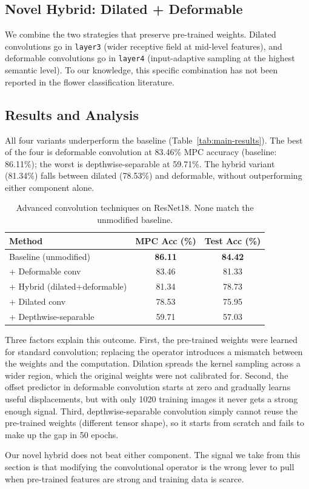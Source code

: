 \subsection{Novel Hybrid: Dilated + Deformable}
We combine the two strategies that preserve pre-trained weights. Dilated convolutions go in \texttt{layer3} (wider receptive field at mid-level features), and deformable convolutions go in \texttt{layer4} (input-adaptive sampling at the highest semantic level). To our knowledge, this specific combination has not been reported in the flower classification literature.

\subsection{Results and Analysis}
All four variants underperform the baseline (Table~\ref{tab:main-results}). The best of the four is deformable convolution at 83.46\% MPC accuracy (baseline: 86.11\%); the worst is depthwise-separable at 59.71\%. The hybrid variant (81.34\%) falls between dilated (78.53\%) and deformable, without outperforming either component alone.

\begin{table}[H]
\centering
\small
\begin{tabular}{lcc}
\toprule
Method & MPC Acc (\%) & Test Acc (\%) \\
\midrule
Baseline (unmodified) & \textbf{86.11} & \textbf{84.42} \\
+ Deformable conv     & 83.46 & 81.33 \\
+ Hybrid (dilated+deformable) & 81.34 & 78.73 \\
+ Dilated conv        & 78.53 & 75.95 \\
+ Depthwise-separable & 59.71 & 57.03 \\
\bottomrule
\end{tabular}
\caption{Advanced convolution techniques on ResNet18. None match the unmodified baseline.}
\label{tab:conv-results}
\end{table}

Three factors explain this outcome. First, the pre-trained weights were learned for standard convolution; replacing the operator introduces a mismatch between the weights and the computation. Dilation spreads the kernel sampling across a wider region, which the original weights were not calibrated for. Second, the offset predictor in deformable convolution starts at zero and gradually learns useful displacements, but with only 1020 training images it never gets a strong enough signal. Third, depthwise-separable convolution simply cannot reuse the pre-trained weights (different tensor shape), so it starts from scratch and fails to make up the gap in 50 epochs.

Our novel hybrid does not beat either component. The signal we take from this section is that modifying the convolutional operator is the wrong lever to pull when pre-trained features are strong and training data is scarce.
